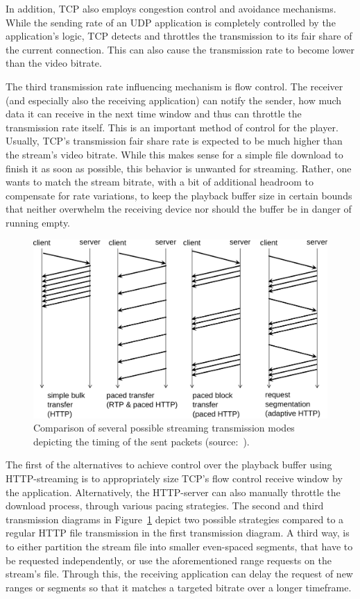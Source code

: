 In addition, \gls{TCP} also employs congestion control and avoidance mechanisms. While the sending rate of an \gls{UDP} application is completely controlled by the application's logic, \gls{TCP} detects and throttles the transmission to its fair share of the current connection. This can also cause the transmission rate to become lower than the video bitrate. 

The third transmission rate influencing mechanism is flow control. The receiver (and especially also the receiving application) can notify the sender, how much data it can receive in the next time window and thus can throttle the transmission rate itself. This is an important method of control for the player. Usually, \gls{TCP}'s transmission fair share rate is expected to be much higher than the stream's video bitrate. While this makes sense for a simple file download to finish it as soon as possible, this behavior is unwanted for streaming. Rather, one wants to match the stream bitrate, with a bit of additional headroom to compensate for rate variations, to keep the playback buffer size in certain bounds that neither overwhelm the receiving device nor should the buffer be in danger of running empty. 

\begin{figure}[htbp]
	\centering
	\includegraphics[width=1.0\textwidth]{images/streaming-transfer-modes.pdf}
	\caption{Comparison of several possible streaming transmission modes depicting the timing of the sent packets (source:~\cite{ma2011mobile}).}
\label{c3:fig:streamingtransfermodes}
\end{figure}

The first of the alternatives to achieve control over the playback buffer using \gls{HTTP}-streaming is to appropriately size \gls{TCP}'s flow control receive window by the application. 
Alternatively, the \gls{HTTP}-server can also manually throttle the download process, through various pacing strategies. The second and third transmission diagrams in Figure~\ref{c3:fig:streamingtransfermodes} depict two possible strategies compared to a regular \gls{HTTP} file transmission in the first transmission diagram. A third way, is to either partition the stream file into smaller even-spaced segments, that have to be requested independently, or use the aforementioned range requests on the stream's file. Through this, the receiving application can delay the request of new ranges or segments so that it matches a targeted bitrate over a longer timeframe.

